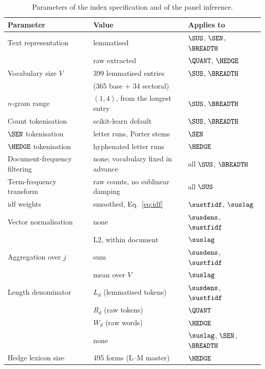 \begin{table}[tbp]
\centering
\small
\caption{Parameters of the index specification and of the panel inference.}
\label{tab:index-parameters}
\begin{tabular}{lll}
\toprule
Parameter & Value & Applies to \\
\midrule
Text representation              & lemmatised & $\SUS$, $\SEN$, $\BREADTH$ \\
                                 & raw extracted & $\QUANT$, $\HEDGE$ \\
Vocabulary size $V$              & 399 lemmatised entries & $\SUS$, $\BREADTH$ \\
                                 & (365 base + 34 sectoral) & \\
$n$-gram range                   & $(1,4)$, from the longest entry & $\SUS$, $\BREADTH$ \\
Count tokenisation               & scikit-learn default & $\SUS$, $\BREADTH$ \\
$\SEN$ tokenisation              & letter runs, Porter stems & $\SEN$ \\
$\HEDGE$ tokenisation            & hyphenated letter runs & $\HEDGE$ \\
Document-frequency filtering     & none; vocabulary fixed in advance & all $\SUS$, $\BREADTH$ \\
Term-frequency transform         & raw counts, no sublinear damping & all $\SUS$ \\
idf weights                      & smoothed, Eq.~\eqref{eq:idf} & $\sustfidf$, $\suslag$ \\
Vector normalisation             & none & $\susdens$, $\sustfidf$ \\
                                 & L2, within document & $\suslag$ \\
Aggregation over $j$             & sum & $\susdens$, $\sustfidf$ \\
                                 & mean over $V$ & $\suslag$ \\
Length denominator               & $L_d$ (lemmatised tokens) & $\susdens$, $\sustfidf$ \\
                                 & $R_d$ (raw tokens) & $\QUANT$ \\
                                 & $W_d$ (raw words) & $\HEDGE$ \\
                                 & none & $\suslag$, $\SEN$, $\BREADTH$ \\
Hedge lexicon size               & 495 forms (L--M master) & $\HEDGE$ \\

\end{tabular}
\end{table}
